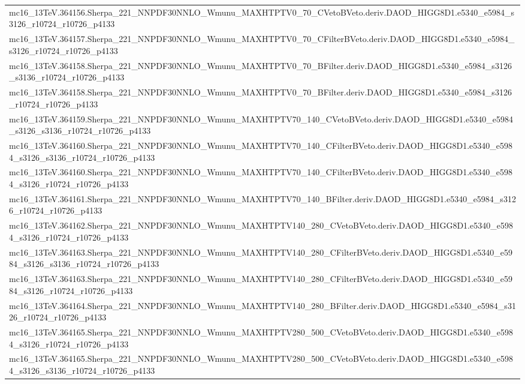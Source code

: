 \begin{adjustwidth}{-3em}{-3em}
\begin{longtable}{l}
mc16\_13TeV.364156.Sherpa\_221\_NNPDF30NNLO\_Wmunu\_MAXHTPTV0\_70\_CVetoBVeto.deriv.DAOD\_HIGG8D1.e5340\_e5984\_s3126\_r10724\_r10726\_p4133 \\
mc16\_13TeV.364157.Sherpa\_221\_NNPDF30NNLO\_Wmunu\_MAXHTPTV0\_70\_CFilterBVeto.deriv.DAOD\_HIGG8D1.e5340\_e5984\_s3126\_r10724\_r10726\_p4133 \\
mc16\_13TeV.364158.Sherpa\_221\_NNPDF30NNLO\_Wmunu\_MAXHTPTV0\_70\_BFilter.deriv.DAOD\_HIGG8D1.e5340\_e5984\_s3126\_s3136\_r10724\_r10726\_p4133 \\
mc16\_13TeV.364158.Sherpa\_221\_NNPDF30NNLO\_Wmunu\_MAXHTPTV0\_70\_BFilter.deriv.DAOD\_HIGG8D1.e5340\_e5984\_s3126\_r10724\_r10726\_p4133 \\
mc16\_13TeV.364159.Sherpa\_221\_NNPDF30NNLO\_Wmunu\_MAXHTPTV70\_140\_CVetoBVeto.deriv.DAOD\_HIGG8D1.e5340\_e5984\_s3126\_s3136\_r10724\_r10726\_p4133 \\
mc16\_13TeV.364160.Sherpa\_221\_NNPDF30NNLO\_Wmunu\_MAXHTPTV70\_140\_CFilterBVeto.deriv.DAOD\_HIGG8D1.e5340\_e5984\_s3126\_s3136\_r10724\_r10726\_p4133 \\
mc16\_13TeV.364160.Sherpa\_221\_NNPDF30NNLO\_Wmunu\_MAXHTPTV70\_140\_CFilterBVeto.deriv.DAOD\_HIGG8D1.e5340\_e5984\_s3126\_r10724\_r10726\_p4133 \\
mc16\_13TeV.364161.Sherpa\_221\_NNPDF30NNLO\_Wmunu\_MAXHTPTV70\_140\_BFilter.deriv.DAOD\_HIGG8D1.e5340\_e5984\_s3126\_r10724\_r10726\_p4133 \\
mc16\_13TeV.364162.Sherpa\_221\_NNPDF30NNLO\_Wmunu\_MAXHTPTV140\_280\_CVetoBVeto.deriv.DAOD\_HIGG8D1.e5340\_e5984\_s3126\_r10724\_r10726\_p4133 \\
mc16\_13TeV.364163.Sherpa\_221\_NNPDF30NNLO\_Wmunu\_MAXHTPTV140\_280\_CFilterBVeto.deriv.DAOD\_HIGG8D1.e5340\_e5984\_s3126\_s3136\_r10724\_r10726\_p4133 \\
mc16\_13TeV.364163.Sherpa\_221\_NNPDF30NNLO\_Wmunu\_MAXHTPTV140\_280\_CFilterBVeto.deriv.DAOD\_HIGG8D1.e5340\_e5984\_s3126\_r10724\_r10726\_p4133 \\
mc16\_13TeV.364164.Sherpa\_221\_NNPDF30NNLO\_Wmunu\_MAXHTPTV140\_280\_BFilter.deriv.DAOD\_HIGG8D1.e5340\_e5984\_s3126\_r10724\_r10726\_p4133 \\
mc16\_13TeV.364165.Sherpa\_221\_NNPDF30NNLO\_Wmunu\_MAXHTPTV280\_500\_CVetoBVeto.deriv.DAOD\_HIGG8D1.e5340\_e5984\_s3126\_r10724\_r10726\_p4133 \\
mc16\_13TeV.364165.Sherpa\_221\_NNPDF30NNLO\_Wmunu\_MAXHTPTV280\_500\_CVetoBVeto.deriv.DAOD\_HIGG8D1.e5340\_e5984\_s3126\_s3136\_r10724\_r10726\_p4133 \\

\end{longtable}
\end{adjustwidth}
